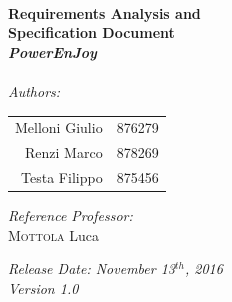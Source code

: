 \begin{titlepage}
\HRule \\[0.4cm]
{ \huge \bfseries Requirements Analysis and\\Specification Document\\[0.5cm]\textit{PowerEnJoy}}\\[0.4cm] %
\HRule \\[1.5cm]
 
\Large \emph{Authors:}\\
\LARGE{
\begin{center}
\begin{tabular}{ r  l }
	Melloni Giulio & 876279\\
	Renzi Marco & 878269\\
	Testa Filippo & 875456 \\
\end{tabular}
\end{center}
}
\vspace*{0.8cm}
\Large{\emph{Reference Professor:} \\
{\textsc{Mottola} Luca} 
}

 \vspace*{1cm}
{\LARGE {\it Release Date: November 13$^{th}$, 2016\\Version 1.0}}

\end{titlepage}